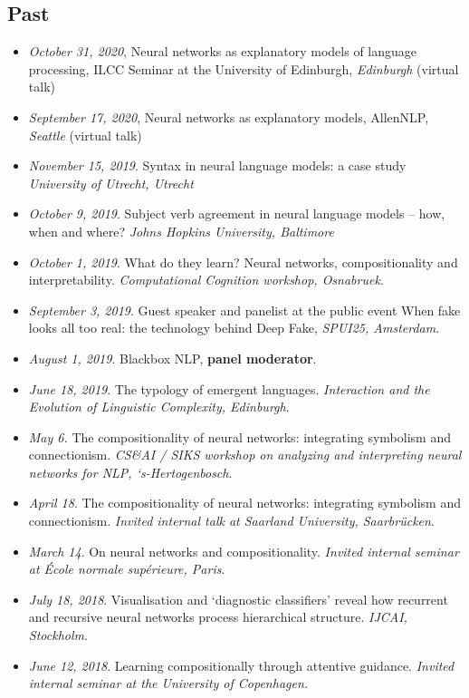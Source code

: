 \subsection{Past}
\begin{itemize}
\setlength\itemsep{5pt}
    \item \textit{October 31, 2020}, Neural networks as explanatory models of language processing, ILCC Seminar at the University of Edinburgh, \textit{Edinburgh} (virtual talk)
    \item \textit{September 17, 2020}, Neural networks as explanatory models, AllenNLP, \textit{Seattle} (virtual talk)
    \item \textit{November 15, 2019}. Syntax in neural language models: a case study \textit{University of Utrecht, Utrecht}
    \item \textit{October 9, 2019}. Subject verb agreement in neural language models -- how, when and where? \textit{Johns Hopkins University, Baltimore}
    \item \textit{October 1, 2019}. What do they learn? Neural networks, compositionality and interpretability. \textit{Computational Cognition workshop, Osnabruek}.
    \item \textit{September 3, 2019}. Guest speaker and panelist at the public event When fake looks all too real: the technology behind Deep Fake, \textit{SPUI25, Amsterdam}.
    \item \textit{August 1, 2019}. Blackbox NLP, \textbf{panel moderator}.
    \item \textit{June 18, 2019}. The typology of emergent languages. \textit{Interaction and the Evolution of Linguistic Complexity, Edinburgh}.
    \item \textit{May 6.} The compositionality of neural networks: integrating symbolism and connectionism. \textit{CS\&AI / SIKS workshop on analyzing and interpreting neural networks for NLP, ‘s-Hertogenbosch}.
    \item \textit{April 18}. The compositionality of neural networks: integrating symbolism and connectionism. \textit{Invited internal talk at Saarland University, Saarbrücken}.
    \item \textit{March 14}. On neural networks and compositionality. \textit{Invited internal seminar at École normale supérieure, Paris}.
    \item \textit{July 18, 2018}. Visualisation and ‘diagnostic classifiers’ reveal how recurrent and recursive neural networks process hierarchical structure. \textit{IJCAI, Stockholm}.
    \item \textit{June 12, 2018}. Learning compositionally through attentive guidance. \textit{Invited internal seminar at the University of Copenhagen.}

\end{itemize}

